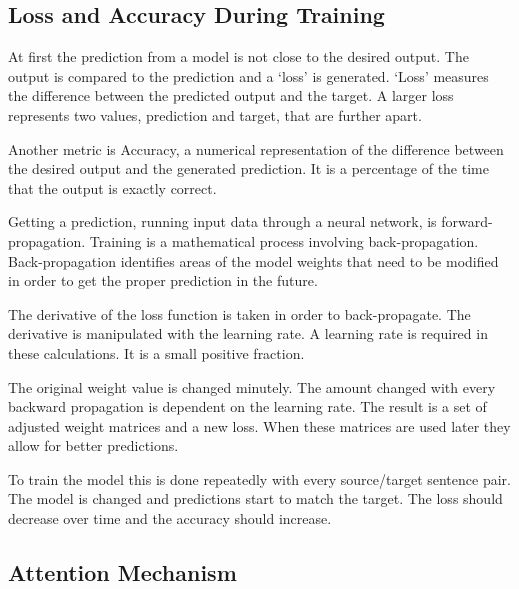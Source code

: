 \subsection{Loss and Accuracy During Training}

At first the prediction from a model is not close to the desired output. The output is compared to the prediction and a `loss' is generated. `Loss' measures the difference between the predicted output and the target. A larger loss represents two values, prediction and target, that are further apart. 

Another metric is Accuracy, a numerical representation of the difference between the desired output and the generated prediction. It is a percentage of the time that the output is exactly correct.

Getting a prediction, running input data through a neural network, is forward-propagation. Training is a mathematical process involving back-propagation. Back-propagation identifies areas of the model weights that need to be modified in order to get the proper prediction in the future.

The derivative of the loss function is taken in order to back-propagate. The derivative is manipulated with the learning rate. A learning rate is required in these calculations. It is a small positive fraction. 

The original weight value is changed minutely. The amount changed with every backward propagation is dependent on the learning rate. The result is a set of adjusted weight matrices and a new loss. When these matrices are used later they allow for better predictions. 

To train the model this is done repeatedly with every source/target sentence pair. The model is changed and predictions start to match the target. The loss should decrease over time and the accuracy should increase.



\subsection{Attention Mechanism}

\label{section-gru-attention}

